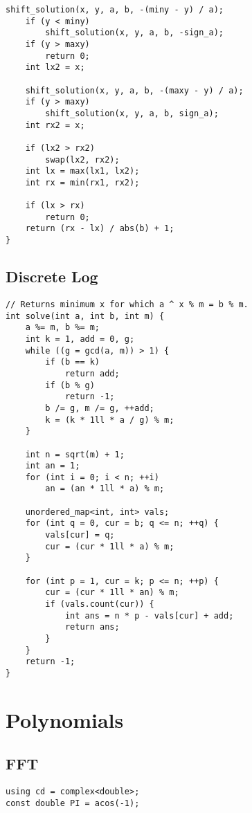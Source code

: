 \documentclass[10pt]{article}
\begin{document}
\begin{multicols*}{2}
\begin{lstlisting}[style=compactcpp]
    shift_solution(x, y, a, b, -(miny - y) / a);
    if (y < miny)
        shift_solution(x, y, a, b, -sign_a);
    if (y > maxy)
        return 0;
    int lx2 = x;

    shift_solution(x, y, a, b, -(maxy - y) / a);
    if (y > maxy)
        shift_solution(x, y, a, b, sign_a);
    int rx2 = x;

    if (lx2 > rx2)
        swap(lx2, rx2);
    int lx = max(lx1, lx2);
    int rx = min(rx1, rx2);

    if (lx > rx)
        return 0;
    return (rx - lx) / abs(b) + 1;
}
\end{lstlisting}

\subsection{Discrete Log}

\begin{lstlisting}[style=compactcpp]
// Returns minimum x for which a ^ x % m = b % m.
int solve(int a, int b, int m) {
    a %= m, b %= m;
    int k = 1, add = 0, g;
    while ((g = gcd(a, m)) > 1) {
        if (b == k)
            return add;
        if (b % g)
            return -1;
        b /= g, m /= g, ++add;
        k = (k * 1ll * a / g) % m;
    }

    int n = sqrt(m) + 1;
    int an = 1;
    for (int i = 0; i < n; ++i)
        an = (an * 1ll * a) % m;

    unordered_map<int, int> vals;
    for (int q = 0, cur = b; q <= n; ++q) {
        vals[cur] = q;
        cur = (cur * 1ll * a) % m;
    }

    for (int p = 1, cur = k; p <= n; ++p) {
        cur = (cur * 1ll * an) % m;
        if (vals.count(cur)) {
            int ans = n * p - vals[cur] + add;
            return ans;
        }
    }
    return -1;
}
\end{lstlisting}

\section{Polynomials}

\subsection{FFT}

\begin{lstlisting}[style=compactcpp]
using cd = complex<double>;
const double PI = acos(-1);


\end{lstlisting}
\end{multicols*}
\end{document}
